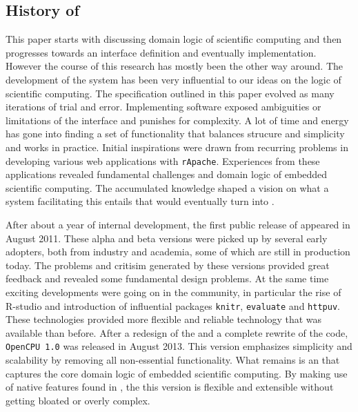 \subsection{History of \OpenCPU}

This paper starts with discussing domain logic of scientific computing and then progresses towards an interface definition and eventually implementation. However the course of this research has mostly been the other way around. The development of the \OpenCPU system has been very influential  to our ideas on the logic of scientific computing. The \OpenCPU specification outlined in this paper evolved as many iterations of trial and error. Implementing software exposed ambiguities or limitations of the interface and punishes for complexity. A lot of time and energy has gone into finding a set of functionality that balances strucure and simplicity and works in practice. Initial inspirations were drawn from recurring problems in developing various \R web applications with \texttt{rApache}. Experiences from these applications revealed fundamental challenges and domain logic of embedded scientific computing. The accumulated knowledge shaped a vision on what a system facilitating this entails that would eventually turn into \OpenCPU.

After about a year of internal development, the first public release of \OpenCPU appeared in August 2011. These alpha and beta versions were picked up by several early adopters, both from industry and academia, some of which are still in production today. The problems and critisim generated by these versions provided great feedback and revealed some fundamental design problems. At the same time exciting developments were going on in the \R community, in particular the rise of R-studio and introduction of influential \R packages \texttt{knitr}, \texttt{evaluate} and \texttt{httpuv}. These technologies provided more flexible and reliable technology that was available than before. After a redesign of the \API and a complete rewrite of the code, \texttt{OpenCPU 1.0} was released in August 2013. This version emphasizes simplicity and scalability by removing all non-essential functionality. What remains is an \API that captures the core domain logic of embedded scientific computing. By making use of native features found in \HTTP, the this version is flexible and extensible without getting bloated or overly complex.

